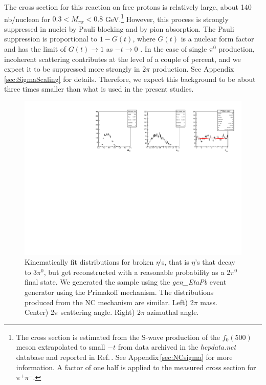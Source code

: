The cross section for this reaction on free protons is relatively large, about 140 nb/nucleon  for $0.3 < M_{\pi\pi} < 0.8$ GeV.\footnote{The cross section is estimated from the S-wave production of the $f_0(500)$ meson extrapolated to small $-t$ from data archived in the {\em hepdata.net} database and reported in Ref.\,\cite{Battaglieri:2009aa}. See Appendix\,\ref{sec:NCsigma} for more information. A factor of one half is applied to the measured cross section for $\pi^+\pi^-$.} However, this process is strongly suppressed in nuclei by Pauli blocking and by pion absorption. The Pauli suppression is proportional to $1-G(t)$, where $G(t)$ is a nuclear form factor and has the limit of $G(t)\to1$ as $-t\to0$ \cite{Gevorkyan:2009ge,primex_inc}. In the case of single $\pi^0$ production, incoherent scattering contributes at the level of a couple of percent, and we expect it to be suppressed more strongly in $2\pi$ production. See Appendix\,\ref{sec:SigmaScaling} for details. Therefore, we expect this background to be about three times smaller than what is used in the present studies.

\begin{figure}[tbp]
\begin{center}
\includegraphics[width=16cm,clip=true]{figures/BrokenEtasPrim.pdf}
\caption{Kinematically fit distributions for broken $\eta$'s, that is $\eta$'s that decay to 3$\pi^0$, but get reconstructed with a reasonable probability as a 2$\pi^0$ final state.
We generated the sample using the {\em gen\_EtaPb} event generator using the Primakoff mechanism. The distributions produced from the NC mechanism are similar. 
Left) 2$\pi$ mass. Center) 2$\pi$ scattering angle. Right) 2$\pi$ azimuthal angle.
\label{fig:eta}}
\end{center} 
\end{figure}



